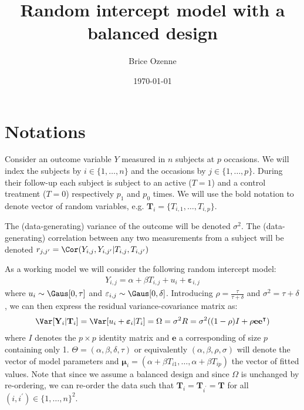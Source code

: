 \documentclass[12pt]{article}
\author{Brice Ozenne}
\date{\today}
\title{Random intercept model with a balanced design}
\newcommand\Ve{\mathbf{e}}
\newcommand\VT{\mathbf{T}}
\newcommand\VY{\mathbf{Y}}
\newcommand\Vvarepsilon{\boldsymbol{\varepsilon}}
\newcommand\Vmu{\boldsymbol{\mu}}
\newcommand\trans[1]{{#1}^\intercal}%
\begin{document}
\maketitle


\section{Notations}
\label{sec:orge1369ec}

Consider an outcome variable \(Y\) measured in \(n\) subjects at \(p\)
occasions. We will index the subjects by \(i \in \{1,\ldots,n\}\) and
the occasions by \(j \in \{1,\ldots,p\}\). During their follow-up each
subject is subject to an active (\(T=1\)) and a control treatment
(\(T=0\)) respectively \(p_1\) and \(p_0\) times. We will use the bold
notation to denote vector of random variables, e.g.
\(\VT_i=\{T_{i,1},\ldots,T_{i,p}\}\).

\bigskip

The (data-generating) variance of the outcome will be denoted
\(\sigma^2\). The (data-generating) correlation between any two
measurements from a subject will be denoted \(r_{j,j^{\prime}} = \Cor(Y_{i,j},Y_{i,j^{\prime}}|T_{i,j},T_{i,j^{\prime}})\)

\bigskip

As a working model we will consider the following random intercept
model:
\begin{align*}
Y_{i,j} = \alpha + \beta T_{i,j} + u_i + \Vvarepsilon_{i,j}
\end{align*}
where \(u_i \sim \Gaus[0,\tau]\) and \(\varepsilon_{i,j} \sim
\Gaus[0,\delta]\). Introducing \(\rho = \frac{\tau}{\tau+\delta}\) and
\(\sigma^2=\tau+\delta\), we can then express the residual
variance-covariance matrix as:
\begin{align*}
\Var[\VY_{i}|\VT_i] = \Var[u_{i} + \Vvarepsilon_{i}|T_i] = \Omega = \sigma^2 R = \sigma^2 ((1-\rho) I + \rho \Ve\trans{\Ve})
\end{align*}
where \(I\) denotes the \(p \times p\) identity matrix and \(\Ve\) a
corresponding of size \(p\) containing only 1. \(\Theta =
(\alpha,\beta,\delta,\tau)\) or equivalently
\((\alpha,\beta,\rho,\sigma)\) will denote the vector of model
parameters and \(\Vmu_{i}=\left(\alpha+\beta
T_{i1},\ldots,\alpha+\beta T_{ip}\right)\) the vector of fitted
values. Note that since we assume a balanced design and since
\(\Omega\) is unchanged by re-ordering, we can re-order the data such
that \(\VT_i=\VT_{i^{\prime}}=\VT\) for all \((i,i^{\prime})\in\{1,\ldots,n\}^2\).
\end{document}
